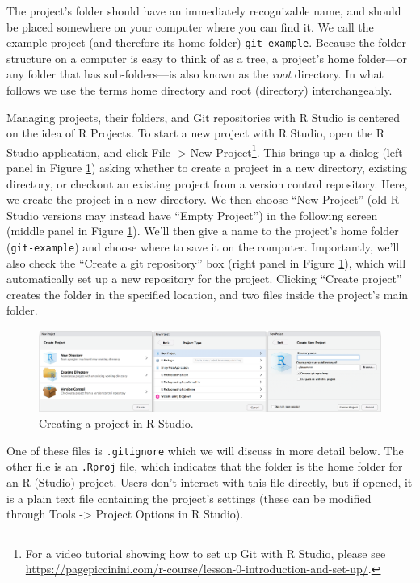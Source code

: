 \documentclass[
  american,
  ,doc,floatsintext]{apa6}
\begin{document}
The project's folder should have an immediately recognizable name, and should be placed somewhere on your computer where you can find it. We call the example project (and therefore its home folder) \texttt{git-example}. Because the folder structure on a computer is easy to think of as a tree, a project's home folder---or any folder that has sub-folders---is also known as the \emph{root} directory. In what follows we use the terms home directory and root (directory) interchangeably.

Managing projects, their folders, and Git repositories with R Studio is centered on the idea of R Projects. To start a new project with R Studio, open the R Studio application, and click File -\textgreater{} New Project\footnote{For a video tutorial showing how to set up Git with R Studio, please see \url{https://pagepiccinini.com/r-course/lesson-0-introduction-and-set-up/}.}. This brings up a dialog (left panel in Figure \ref{fig:rstudio-project-1}) asking whether to create a project in a new directory, existing directory, or checkout an existing project from a version control repository. Here, we create the project in a new directory. We then choose \enquote{New Project} (old R Studio versions may instead have \enquote{Empty Project}) in the following screen (middle panel in Figure \ref{fig:rstudio-project-1}). We'll then give a name to the project's home folder (\texttt{git-example}) and choose where to save it on the computer. Importantly, we'll also check the \enquote{Create a git repository} box (right panel in Figure \ref{fig:rstudio-project-1}), which will automatically set up a new repository for the project. Clicking \enquote{Create project} creates the folder in the specified location, and two files inside the project's main folder.

\begin{figure}

{\centering \includegraphics[width=6in]{images/rstudio-project-1} 

}

\caption{Creating a project in R Studio.}\label{fig:rstudio-project-1}
\end{figure}

One of these files is \texttt{.gitignore} which we will discuss in more detail below. The other file is an \texttt{.Rproj} file, which indicates that the folder is the home folder for an R (Studio) project. Users don't interact with this file directly, but if opened, it is a plain text file containing the project's settings (these can be modified through Tools -\textgreater{} Project Options in R Studio).
\end{document}
